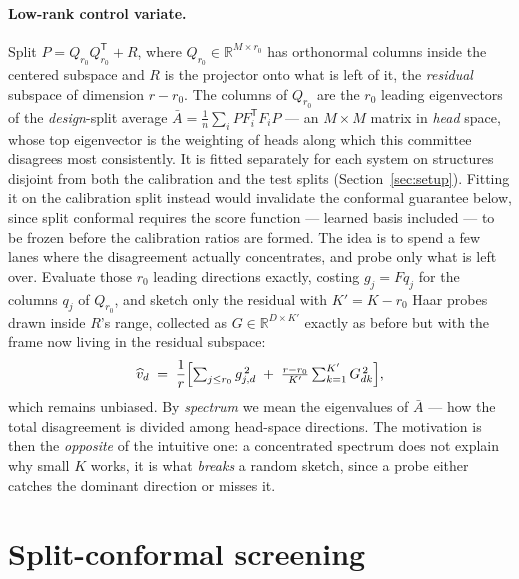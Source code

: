 \documentclass{article}
\begin{document}
\paragraph{Low-rank control variate.}
Split $P = Q_{r_0}Q_{r_0}^{\mathsf T} + R$, where $Q_{r_0}\in\mathbb{R}^{M\times r_0}$ has
orthonormal columns inside the centered subspace and $R$ is the projector onto what is left of it,
the \emph{residual} subspace of dimension $r-r_0$. The columns of $Q_{r_0}$ are the $r_0$ leading
eigenvectors of the \emph{design}-split average $\bar A=\tfrac1n\sum_i PF_i^{\mathsf T}F_iP$ --- an
$M\times M$ matrix in \emph{head} space, whose top eigenvector is the weighting of heads along which
this committee disagrees most consistently. It is fitted separately for
each system on structures disjoint from both the calibration and the test splits
(Section~\ref{sec:setup}). Fitting it on the calibration split instead would invalidate the conformal
guarantee below, since split conformal requires the score function --- learned basis included --- to
be frozen before the calibration ratios are formed. The idea is to spend a few lanes where the disagreement actually concentrates, and probe only what
is left over. Evaluate those $r_0$ leading directions exactly, costing $g_j=Fq_j$ for the columns
$q_j$ of $Q_{r_0}$, and sketch only the residual with $K'=K-r_0$ Haar probes drawn inside $R$'s
range, collected as $G\in\mathbb{R}^{D\times K'}$ exactly as before but with the frame now living in
the residual subspace:
\begin{equation}
\widehat v_d \;=\; \frac{1}{r}\Bigl[\textstyle\sum_{j\le r_0} g_{j,d}^{\,2} \;+\; \frac{r-r_0}{K'}\sum_{k=1}^{K'} G_{dk}^{\,2}\Bigr],
\end{equation}
which remains unbiased. By \emph{spectrum} we mean the eigenvalues of $\bar A$ --- how the total
disagreement is divided among head-space directions. The motivation is then the \emph{opposite} of
the intuitive one: a concentrated spectrum does not explain why small $K$ works, it is what
\emph{breaks} a random sketch, since a probe either catches the dominant direction or misses it.


\section{Split-conformal screening}
\label{app:conformal}
\end{document}
